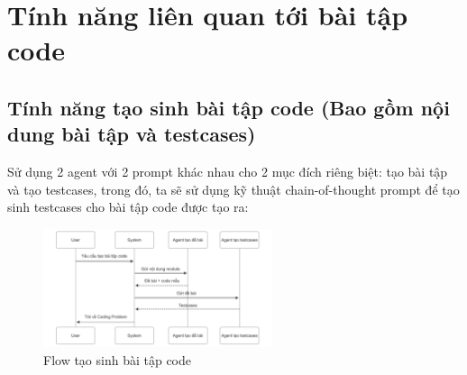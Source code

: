 \section{Tính năng liên quan tới bài tập code}

\subsection{Tính năng tạo sinh bài tập code (Bao gồm nội dung bài tập và testcases)}

Sử dụng 2 agent với 2 prompt khác nhau cho 2 mục đích riêng biệt: tạo bài tập và tạo testcases, trong đó, ta sẽ sử dụng kỹ thuật chain-of-thought prompt để tạo sinh testcases cho bài tập code được tạo ra:

\begin{figure}[H]
\centering
    \includegraphics[width=0.6\textwidth]{images/coding_exercise_gen_flow.png}
    \caption{Flow tạo sinh bài tập code}
\end{figure}

